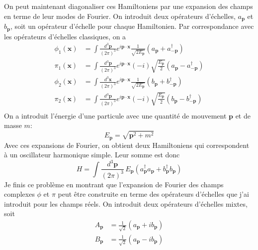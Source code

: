 \documentclass{article}
\numberwithin{equation}{section}
\begin{document}
On peut maintenant diagonaliser ces Hamiltoniens par une expansion des champs en terme de leur modes de Fourier. 
On introduit deux opérateurs d'échelles, $a_{\mathbf{p}}$ et $b_{\mathbf{p}}$, soit un 
opérateur d'échelle pour chaque Hamiltonien. Par correspondance avec les opérateurs d'échelles classiques, on a
\begin{align}
        \phi_1(\mathbf{x}) &=  \int \frac{d^{3}\mathbf{p}}{(2 \pi)^{3}}e^{i \mathbf{p} \cdot \mathbf{x}} \frac{1}{\sqrt{2 E_{\mathbf{p}}}} (a_{\mathbf{p}} + a^{\dagger}_{-\mathbf{p}}) \\
        \pi_1(\mathbf{x}) &=  \int \frac{d^{3}\mathbf{p}}{(2 \pi)^{3}} e^{i \mathbf{p} \cdot \mathbf{x}} (-i)\sqrt{\frac{E_{\mathbf{p}}}{2}}(a_{\mathbf{p}} - a^{\dagger}_{-\mathbf{p}}) \\
        \phi_2(\mathbf{x}) &=  \int \frac{d^{3} \mathbf{x}}{(2\pi)^{3}}e^{i\mathbf{p} \cdot \mathbf{x}}\frac{1}{\sqrt{2E_{\mathbf{p}}}} (b_{\mathbf{p}} + b^{\dagger}_{-\mathbf{p}}) \\
        \pi_2(\mathbf{x}) &=  \int \frac{d^{3}\mathbf{p}}{(2 \pi)^{3}} e^{i \mathbf{p} \cdot \mathbf{x}} (-i)\sqrt{\frac{E_{\mathbf{p}}}{2}}(b_{\mathbf{p}} - b^{\dagger}_{-\mathbf{p}}) \\
\end{align} 
On a introduit l'énergie d'une particule avec une quantité de mouvement $\mathbf{p}$ 
et de masse $m$:
\begin{equation}
        E_{\mathbf{p}} = \sqrt{\mathbf{p}^2 + m^2}
\end{equation} 
Avec ces expansions de Fourier, on obtient deux Hamiltoniens qui correspondent à un oscillateur harmonique simple. Leur somme est donc
\begin{equation}
        H = \int \frac{d^{3}\mathbf{p}}{(2\pi)^{3}}\, E_{\mathbf{p}}(a^{\dagger}_{\mathbf{p}}a_{\mathbf{p}} + b^{\dagger}_{\mathbf{p}}b_{\mathbf{p}})
\end{equation} 
Je finis ce problème en montrant que l'expansion de Fourier des champs complexes $\phi$ et $\pi$ peut être construite en terme 
des opérateurs d'échelles que j'ai introduit pour les champs réels. 
On introduit deux opérateurs d'échelles mixtes, soit
\begin{align}
        \label{eq:A mixte}
        A_{\mathbf{p}} &= \frac{1}{\sqrt{2}}(a_{\mathbf{p}} + ib_{\mathbf{p}}) \\
        \label{eq:B mixte}
        B_{\mathbf{p}} &=  \frac{1}{\sqrt{2}}(a_{\mathbf{p}} - ib_{\mathbf{p}})
\end{align}
\end{document}
